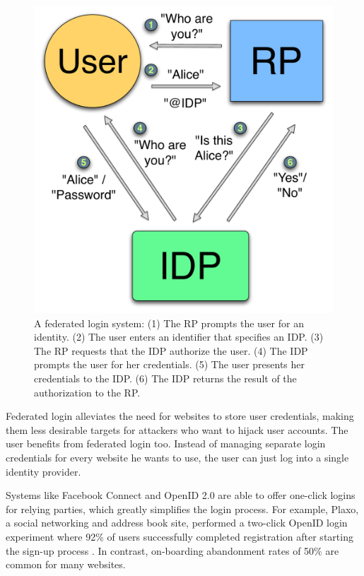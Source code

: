 \documentclass{llncs}
\begin{document}
\begin{figure}
  \centering
  \includegraphics[scale=0.5]{figs/fig-fedlog-color.pdf}
  \caption{A federated login system: (1) The RP prompts the user
    for an identity. (2) The user enters an identifier that specifies
    an IDP. (3) The RP requests that the IDP authorize the user. (4)
    The IDP prompts the user for her credentials. (5) The user
    presents her credentials to the IDP. (6) The IDP returns the
    result of the authorization to the RP.}
  \label{fig:fedlog}
\end{figure}

Federated login alleviates the need for websites to store user
credentials, making them less desirable targets for attackers who want
to hijack user accounts. The user benefits from federated login too.
Instead of managing separate login credentials for every website he
wants to use, the user can just log into a single identity provider.

Systems like Facebook Connect and OpenID 2.0 are able to offer
one-click logins for relying parties, which greatly simplifies the
login process. For example, Plaxo, a social networking and address
book site, performed a two-click OpenID login experiment where 92\% of
users successfully completed registration after starting the sign-up
process \cite{Ki09}. In contrast, on-boarding abandonment rates of
50\% are common for many websites.
\end{document}
